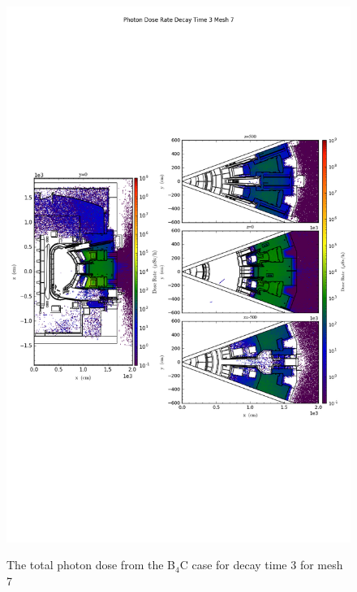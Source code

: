 \begin{figure}[ht!]
\centering
\includegraphics[trim={0cm 9cm 0cm 10cm},clip,scale=0.75]{../plots/final_model_nob4c/Photon_Dose_Rate_Decay_Time_3_Mesh_7.png}
\label{fig:photons_dc3_no4bc_m7_flux}
\caption{The total photon dose from the B$_4$C case for decay time 3 for mesh 7}
\end{figure}
